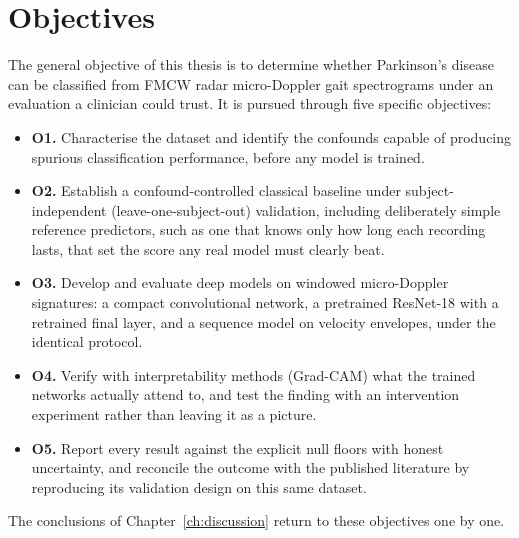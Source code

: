 \section{Objectives}
\label{sec:objectives}

The general objective of this thesis is to determine whether Parkinson's
disease can be classified from FMCW radar micro-Doppler gait spectrograms
under an evaluation a clinician could trust. It is pursued through five
specific objectives:

\begin{itemize}
  \item \textbf{O1.} Characterise the dataset and identify the confounds
        capable of producing spurious classification performance, before
        any model is trained.
  \item \textbf{O2.} Establish a confound-controlled classical baseline
        under subject-independent (leave-one-subject-out) validation,
        including deliberately simple reference predictors, such as one
        that knows only how long each recording lasts, that set the score
        any real model must clearly beat.
  \item \textbf{O3.} Develop and evaluate deep models on windowed
        micro-Doppler signatures: a compact convolutional network, a
        pretrained ResNet-18 with a retrained final layer, and a sequence
        model on velocity envelopes, under the identical protocol.
  \item \textbf{O4.} Verify with interpretability methods (Grad-CAM) what
        the trained networks actually attend to, and test the finding with
        an intervention experiment rather than leaving it as a picture.
  \item \textbf{O5.} Report every result against the explicit null floors
        with honest uncertainty, and reconcile the outcome with the
        published literature by reproducing its validation design on this
        same dataset.
\end{itemize}

The conclusions of Chapter~\ref{ch:discussion} return to these objectives one by one.
